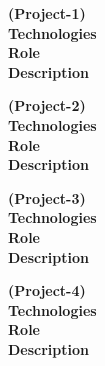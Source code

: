 \documentclass[a4paper,11pt]{memoir} %
\begin{document}
\Sep
\begin{minipage}[t]{0.25\columnwidth}
\textbf{(Project-1)}\\
\textbf{Technologies}\\
\textbf{Role}\\
\textbf{Description}

\vspace{24mm}

\textbf{(Project-2)}\\
\textbf{Technologies}\\
\textbf{Role}\\
\textbf{Description}

\vspace{19.2 mm}

\textbf{(Project-3)}\\
\textbf{Technologies}\\
\textbf{Role}\\
\textbf{Description}\\

\vspace{14.5 mm}

\textbf{(Project-4)}\\
\textbf{Technologies}\\
\textbf{Role}\\
\textbf{Description}\\

\end{minipage}
\hfill
\end{document}
